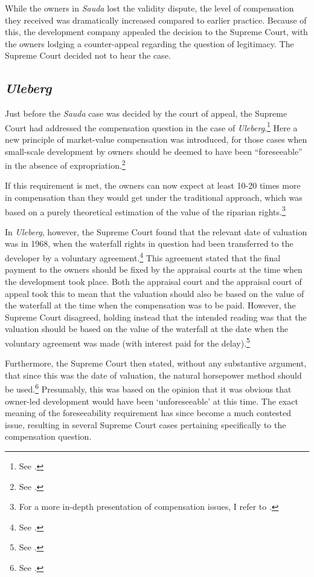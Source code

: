 While the owners in {\it Sauda} lost the validity dispute, the level of compensation they received was dramatically increased compared to earlier practice. Because of this, the development company appealed the decision to the Supreme Court, with the owners lodging a counter-appeal regarding the question of legitimacy. The Supreme Court decided not to hear the case. 

\subsection{{\it Uleberg}}

Just before the {\it Sauda} case was decided by the court of appeal, the Supreme Court had addressed the compensation question in the case of {\it Uleberg}.\footnote{See \cite{uleberg08}.} Here a new principle of market-value compensation was introduced, for those cases when small-scale development by owners should be deemed to have been ``foreseeable'' in the absence of expropriation.\footnote{See \cite[81]{uleberg08}.}

If this requirement is met, the owners can now expect at least 10-20 times more in compensation than they would get under the traditional approach, which was based on a purely theoretical estimation of the value of the riparian rights.\footnote{For a more in-depth presentation of compensation issues, I refer to \cite[71-76]{dyrkolbotn15}.} 

In {\it Uleberg}, however, the Supreme Court found that the relevant date of valuation was in 1968, when the waterfall rights in question had been transferred to the developer by a voluntary agreement.\footnote{See \cite[70]{uleberg08}.} This agreement stated that the final payment to the owners should be fixed by the appraisal courts at the time when the development took place. Both the appraisal court and the appraisal court of appeal took this to mean that the valuation should also be based on the value of the waterfall at the time when the compensation was to be paid. However, the Supreme Court disagreed, holding instead that the intended reading was that the valuation should be based on the value of the waterfall at the date when the voluntary agreement was made (with interest paid for the delay).\footnote{See \cite[71]{uleberg08}.}

Furthermore, the Supreme Court then stated, without any substantive argument, that since this was the date of valuation, the natural horsepower method should be used.\footnote{See \cite[62]{uleberg08}.} Presumably, this was based on the opinion that it was obvious that owner-led development would have been `unforeseeable' at this time. The exact meaning of the foreseeability requirement has since become a much contested issue, resulting in several Supreme Court cases pertaining specifically to the compensation question.

